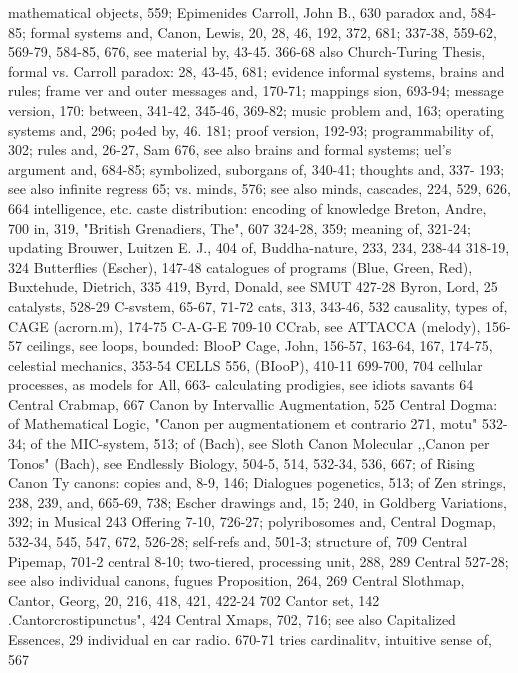 mathematical objects, 559; Epimenides         Carroll, John B., 630
paradox and, 584-85; formal systems and,      Canon, Lewis, 20, 28, 46, 192, 372, 681;
337-38, 559-62, 569-79, 584-85, 676, see      material by, 43-45. 366-68
also Church-Turing Thesis, formal vs.         Carroll paradox: 28, 43-45, 681; evidence
informal systems, brains and rules; frame     ver
and outer messages and, 170-71; mappings      sion, 693-94; message version, 170:
between, 341-42, 345-46, 369-82; music        problem
and, 163; operating systems and, 296;         po4ed by, 46. 181; proof version, 192-93;
programmability of, 302; rules and, 26-27,    Sam
676, see also brains and formal systems;      uel's argument and, 684-85; symbolized,
suborgans of, 340-41; thoughts and, 337-      193; see also infinite regress
65; vs. minds, 576; see also minds,           cascades, 224, 529, 626, 664
intelligence, etc.                            caste distribution: encoding of knowledge
Breton, Andre, 700                            in, 319,
"British Grenadiers, The", 607                324-28, 359; meaning of, 321-24; updating
Brouwer, Luitzen E. J., 404                   of,
Buddha-nature, 233, 234, 238-44               318-19, 324
Butterflies (Escher), 147-48                  catalogues of programs (Blue, Green, Red),
Buxtehude, Dietrich, 335                      419,
Byrd, Donald, see SMUT                        427-28
Byron, Lord, 25                               catalysts, 528-29
C-svstem, 65-67, 71-72                        cats, 313, 343-46, 532 causality, types of,
CAGE (acrorn.m), 174-75 C-A-G-E               709-10 CCrab, see ATTACCA
(melody), 156-57                              ceilings, see loops, bounded: BlooP
Cage, John, 156-57, 163-64, 167, 174-75,      celestial mechanics, 353-54 CELLS
556,                                          (BIooP), 410-11
699-700, 704                                  cellular processes, as models for All, 663-
calculating prodigies, see idiots savants     64 Central Crabmap, 667
Canon by Intervallic Augmentation, 525        Central Dogma: of Mathematical Logic,
"Canon per augmentationem et contrario        271,
motu"                                         532-34; of the MIC-system, 513; of
(Bach), see Sloth Canon                       Molecular
,,Canon per Tonos" (Bach), see Endlessly      Biology, 504-5, 514, 532-34, 536, 667; of
Rising Canon                                  Ty
canons: copies and, 8-9, 146; Dialogues       pogenetics, 513; of Zen strings, 238, 239,
and, 665-69, 738; Escher drawings and, 15;    240,
in Goldberg Variations, 392; in Musical       243
Offering 7-10, 726-27; polyribosomes and,     Central Dogmap, 532-34, 545, 547, 672,
526-28; self-refs and, 501-3; structure of,   709 Central Pipemap, 701-2 central
8-10; two-tiered,                             processing unit, 288, 289 Central
527-28; see also individual canons, fugues    Proposition, 264, 269 Central Slothmap,
Cantor, Georg, 20, 216, 418, 421, 422-24      702
Cantor set, 142 .Cantorcrostipunctus", 424    Central Xmaps, 702, 716; see also
Capitalized Essences, 29                      individual en
car radio. 670-71                             tries
cardinalitv, intuitive sense of, 567



